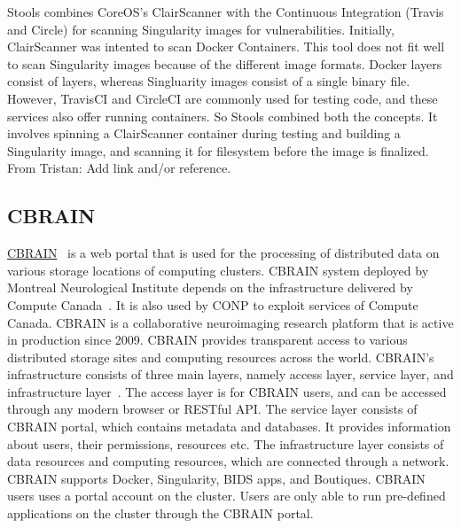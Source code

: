 \documentclass[a4paper,num-refs]{oup-contemporary}
\newcommand{\TG}[1]{\color{blue}From Tristan: #1 \color{black}}
\begin{document}
Stools combines CoreOS's ClairScanner with the Continuous Integration (Travis and
Circle) for scanning Singularity images for vulnerabilities.
Initially, ClairScanner was intented to scan Docker Containers. This tool does not fit well
to scan Singularity images because of the different image formats. Docker layers
consist of layers, whereas Singluarity images consist of a single binary file.
However, TravisCI and CircleCI are commonly used for testing code, and these
services also offer running containers. So Stools combined both the concepts.
It involves spinning a ClairScanner container during testing and building a
Singularity image, and scanning it for filesystem before the image is finalized.
\TG{Add link and/or reference.}

\subsection{CBRAIN}

\href{http://github.com/aces/cbrain}{CBRAIN}~\cite{sherif2014cbrain} is a web portal that is
used for the processing of distributed data on various storage locations of computing
clusters. CBRAIN system deployed by Montreal Neurological Institute depends on the infrastructure
delivered by Compute Canada~\cite{das2016mni}.
It is also used by CONP to exploit services of Compute Canada. CBRAIN is a collaborative
neuroimaging research platform that is active in production since 2009. CBRAIN
provides transparent access to various distributed storage sites and computing
resources across the world. CBRAIN’s infrastructure consists of three main
layers, namely access layer, service layer, and infrastructure layer~\cite{sherif2014cbrain}. The access
layer is for CBRAIN users, and can be accessed through any modern browser or
RESTful API. The service layer consists of CBRAIN portal, which contains
metadata and databases. It provides information about users, their permissions,
resources etc. The infrastructure layer consists of data resources and computing
resources, which are connected through a network. 
CBRAIN supports Docker, Singularity, BIDS apps, and Boutiques.
CBRAIN users uses a portal
account on the cluster. Users are only able to
run pre-defined applications on the cluster through the CBRAIN portal.

%

\end{document}
